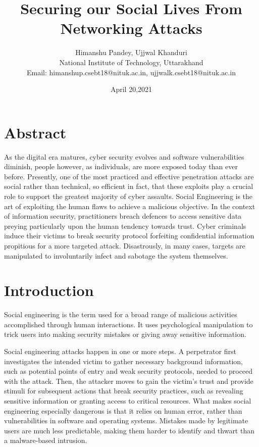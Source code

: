 \documentclass[a4paper,12pt]{article}
\begin{document}
\title{\Large{\textbf{Securing our Social Lives From Networking Attacks}}}
\author{Himanshu Pandey, Ujjwal Khanduri\\ National Institute of Technology, Uttarakhand \\ Email: himanshup.csebt18@nituk.ac.in, ujjwalk.csebt18@nituk.ac.in}
\date{April 20,2021}

\maketitle

\section*{Abstract}

As the digital era matures, cyber security evolves and software vulnerabilities
diminish, people however, as individuals,
are more exposed today than ever before.
Presently, one of the most practiced and effective penetration attacks are social rather
than technical, so efficient in fact, that these
exploits play a crucial role to support the
greatest majority of cyber assaults. Social
Engineering is the art of exploiting the human flaws to achieve a malicious objective.
In the context of information security, practitioners breach defences to access sensitive
data preying particularly upon the human
tendency towards trust. Cyber criminals induce their victims to break security protocol forfeiting confidential information propitious for a more targeted attack. Disastrously, in many cases, targets are manipulated to involuntarily infect and sabotage
the system themselves.

\section{Introduction}

Social engineering is the term used for a broad range of malicious activities accomplished through human interactions. It uses psychological manipulation to trick users into making security mistakes or giving away sensitive information.

Social engineering attacks happen in one or more steps. A perpetrator first investigates the intended victim to gather necessary background information, such as potential points of entry and weak security protocols, needed to proceed with the attack. Then, the attacker moves to gain the victim’s trust and provide stimuli for subsequent actions that break security practices, such as revealing sensitive information or granting access to critical resources.
What makes social engineering especially dangerous is that it relies on human error, rather than vulnerabilities in software and operating systems. Mistakes made by legitimate users are much less predictable, making them harder to identify and thwart than a malware-based intrusion.
\end{document}
